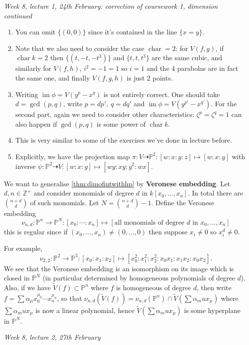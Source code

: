 \documentclass{article}
\newcommand{\Z}{\mathbb{Z}}
\newcommand{\p}{\mathbb{P}}
\newcommand{\im}{\operatorname{im}}
\newcommand{\Char}{\operatorname{char}}
\theoremstyle{definition}
\begin{document}
\begin{flushright}
\textit{Week 8, lecture 1, 24th February: correction of coursework 1, dimension continued}
\end{flushright}

\begin{enumerate}
\item You can omit $\{(0,0)\}$ since it's contained in the line $\{x=y\}$.
\item Note that we also need to consider the case $\Char =2$: for $V(f,g)$, if $\Char k=2$ then $\{(t,-t,-t^3)\}$ and $\{t,t,t^3\}$ are the same cubic, and similarly for $V(f,h)$, $i^2=-1=1$ so $i=1$ and the 4 parabolas are in fact the same one, and finally $V(f,g,h)$ is just 2 points.
\item Writing $\im\phi=V\left(y^p-x^q\right)$ is not entirely correct. One should take $d=\gcd(p,q)$, write $p=dp',\ q=dq'$ and $\im\phi=V\left(y^{p'}-x^{q'}\right)$. For the second part, again we need to consider other characteristics: $\zeta^p=\zeta^q=1$ can also happen if $\gcd(p,q)$ is some power of $\Char k$.
\item This is very similar to some of the exercises we've done in lecture before.
\item Explicitly, we have the projection map $\pi:V\dashrightarrow\p^2:[w:x:y:z]\mapsto[w:x:y]$ with inverse $\psi:\p^2\dashrightarrow V:[w:x:y]\mapsto [wy:xy:y^2:wx]$.
\end{enumerate}

We want to generalise \ref{thm:dimofintwithhp} by \textbf{Veronese embedding}. Let $d,n\in\Z^+$ and consider monomials of degree $d$ in $k[x_0,\ldots,x_n]$. In total there are $\binom{n+d}{d}$ of such monomials. Let $N=\binom{n+d}{d}-1$. Define the Veronese embedding
\[
\nu_{n,d}:\p^n\rightarrow\p^N:[x_0:\cdots:x_n]\mapsto \left[\text{all monomials of degree }d\text{ in }x_0,\ldots,x_n\right]
\]
this is regular since if $(x_0,\ldots,x_n)\neq (0,\ldots,0)$ then suppose $x_i\neq 0$ so $x_i^d\neq 0$.

For example,
\[
\nu_{2,2}:\p^2\rightarrow\p^5:[x_0:x_1:x_2]\mapsto [x_0^2:x_1^2:x_2^2:x_0x_1:x_1x_2:x_0x_2].
\]
We see that the Veronese embedding is an isomorphism on its image which is closed in $\p^N$ (in particular determined by homogeneous polynomials of degree $d$). Also, if we have $\widetilde V(f)\subset \p^n$ where $f$ is homogeneous of degree $d$, then write $f=\sum\alpha_\mu x_0^{\mu_0}\cdots x_n^{\mu_n}$, so that $\nu_{n,d}\left(\widetilde V(f)\right)=\nu_{n,d}(\p^n)\cap \widetilde V\left(\sum\alpha_mu x_\mu\right)$ where $\sum\alpha_mu x_\mu$ is now a linear polynomial, hence $\widetilde V\left(\sum\alpha_mu x_\mu\right)$ is some hyperplane in $\p^N$.
\begin{flushright}
\textit{Week 8, lecture 2, 27th February}
\end{flushright}
\end{document}
